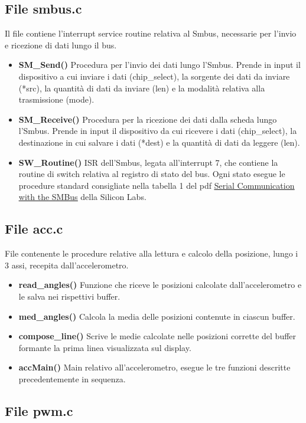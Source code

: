 \documentclass[11pt]{article}
\begin{document}
\subsection*{File smbus.c}
Il file contiene l'interrupt service routine relativa al Smbus, necessarie per l'invio e ricezione di dati lungo il bus.
\begin{itemize}
\item \textbf{SM\_Send()} Procedura per l'invio dei dati lungo l'Smbus. Prende in input il dispositivo a cui inviare i dati (chip\_select), la sorgente dei dati da inviare (*src), la quantità di dati da inviare (len) e la modalità relativa alla trasmissione (mode).
\item \textbf{SM\_Receive()} Procedura per la ricezione dei dati dalla scheda lungo l'Smbus. Prende in input il dispositivo da cui ricevere i dati (chip\_select), la destinazione in cui salvare i dati (*dest) e la quantità di dati da leggere (len).
\item \textbf{SW\_Routine()} ISR dell'Smbus, legata all'interrupt 7, che contiene la routine di switch relativa al registro di stato del bus. Ogni stato esegue le procedure standard consigliate nella tabella 1 del pdf \href{https://www.silabs.com/documents/public/application-notes/an113.pdf} {\underline{Serial Communication with the SMBus}} della Silicon Labs. 
\end{itemize}

\subsection*{File acc.c}
File contenente le procedure relative alla lettura e calcolo della posizione, lungo i 3 assi, recepita dall'accelerometro.
\begin{itemize}
\item \textbf{read\_angles()} Funzione che riceve le posizioni calcolate dall'accelerometro e le salva nei rispettivi buffer.
\item \textbf{med\_angles()} Calcola la media delle posizioni contenute in ciascun buffer.
\item \textbf{compose\_line()} Scrive le medie calcolate nelle posizioni corrette del buffer formante la prima linea visualizzata sul display.
\item \textbf{accMain()} Main relativo all'accelerometro, esegue le tre funzioni descritte precedentemente in sequenza.
\end{itemize}

\subsection*{File pwm.c}
\end{document}
